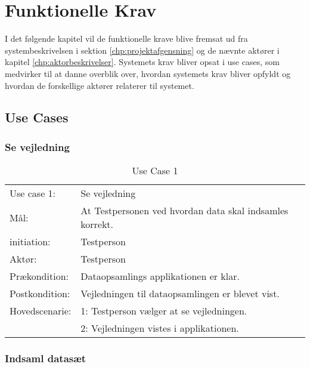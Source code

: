 \chapter{Funktionelle Krav}
\label{chp:funktionellen}
I det følgende kapitel vil de funktionelle krave blive fremsat ud fra systembeskrivelsen i sektion \ref{chp:projektafgensning} og de nævnte aktører i kapitel \ref{chp:aktorbeskrivelser}. Systemets krav bliver opsat i use cases, som medvirker til at danne overblik over, hvordan systemets krav bliver opfyldt og hvordan de forskellige aktører relaterer til systemet.
\section{Use Cases}

\subsection{Se vejledning}
\bgroup
\def\arraystretch{1.8}
\begin{center}
	\begin{table}[htbp]
		\begin{tabular}{lp{10cm}}
			\rowcolor{grey} Use case 1:	& Se vejledning \\
			Mål:	& At Testpersonen ved hvordan data skal indsamles korrekt. \\
			initiation:	& Testperson\\
			Aktør: & Testperson\\
			Prækondition: & Dataopsamlings applikationen er klar.\\
			Postkondition: & Vejledningen til dataopsamlingen er blevet vist.\\
			Hovedscenarie: & 1: Testperson vælger at se vejledningen.\\
			& 2: Vejledningen vistes i applikationen.\\
		\end{tabular}
		\caption{Use Case 1}
	\end{table}
\end{center}
\newpage
\subsection{Indsaml datasæt}

